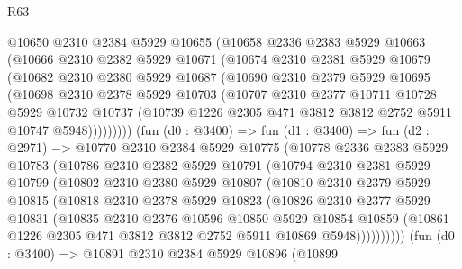 \begin{lexlean}{R63}
\begin{coremodule}
        @10650
          @2310
          @2384
          @5929
          @10655
          (@10658
            @2336
            @2383
            @5929
            @10663
            (@10666
              @2310
              @2382
              @5929
              @10671
              (@10674
                @2310
                @2381
                @5929
                @10679
                (@10682
                  @2310
                  @2380
                  @5929
                  @10687
                  (@10690
                    @2310
                    @2379
                    @5929
                    @10695
                    (@10698
                      @2310
                      @2378
                      @5929
                      @10703
                      (@10707
                        @2310
                        @2377
                        @10711
                        @10728
                        @5929
                        @10732
                        @10737
                        (@10739 @1226 @2305 @471 @3812 @3812 @2752 @5911 @10747 @5948)))))))))
        (fun (d0 : @3400) =>
        fun (d1 : @3400) =>
        fun (d2 : @2971) =>
        @10770
          @2310
          @2384
          @5929
          @10775
          (@10778
            @2336
            @2383
            @5929
            @10783
            (@10786
              @2310
              @2382
              @5929
              @10791
              (@10794
                @2310
                @2381
                @5929
                @10799
                (@10802
                  @2310
                  @2380
                  @5929
                  @10807
                  (@10810
                    @2310
                    @2379
                    @5929
                    @10815
                    (@10818
                      @2310
                      @2378
                      @5929
                      @10823
                      (@10826
                        @2310
                        @2377
                        @5929
                        @10831
                        (@10835
                          @2310
                          @2376
                          @10596
                          @10850
                          @5929
                          @10854
                          @10859
                          (@10861 @1226 @2305 @471 @3812 @3812 @2752 @5911 @10869 @5948))))))))))
        (fun (d0 : @3400) =>
        @10891
          @2310
          @2384
          @5929
          @10896
          (@10899

\end{coremodule}
\end{lexlean}
